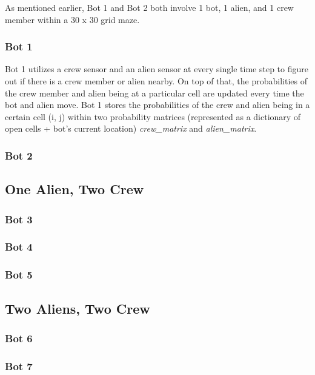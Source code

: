 \documentclass[11pt]{article}
\begin{document}
As mentioned earlier, Bot 1 and Bot 2 both involve 1 bot, 1 alien, and 1 crew member within a 30 x 30 grid maze.

\subsubsection{Bot 1}

Bot 1 utilizes a crew sensor and an alien sensor at every single time step to figure out if there is a crew member or alien nearby. On top of that, the probabilities of the crew member and alien being at a particular cell are updated every time the bot and alien move. Bot 1 stores the probabilities of the crew and alien being in a certain cell (i, j) within two probability matrices (represented as a dictionary of open cells + bot's current location) \textit{crew\_matrix} and \textit{alien\_matrix}.

\subsubsection{Bot 2}

\subsection{One Alien, Two Crew}

\subsubsection{Bot 3}

\subsubsection{Bot 4}

\subsubsection{Bot 5}

\subsection{Two Aliens, Two Crew}

\subsubsection{Bot 6}

\subsubsection{Bot 7}
\end{document}

